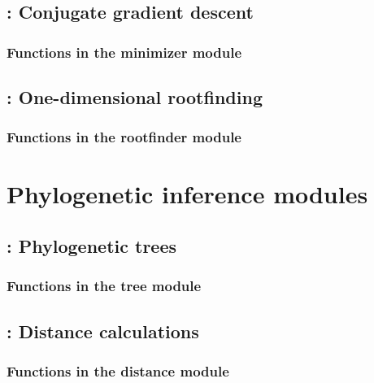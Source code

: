 \documentclass[10pt]{book}
\begin{document}
\section{: Conjugate gradient descent}

\subsection{Functions in the minimizer module}


\newpage
\section{: One-dimensional rootfinding}

\subsection{Functions in the rootfinder module}


\chapter{Phylogenetic inference modules}

\newpage
\section{: Phylogenetic trees}

\subsection{Functions in the tree module}


\newpage
\section{: Distance calculations}

\subsection{Functions in the distance module}







\newpage
\end{document}
